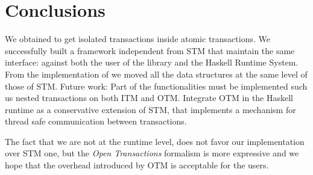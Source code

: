 
\chapter{Conclusions}

We obtained to get isolated transactions inside atomic transactions.
We successfully built a framework independent from STM that maintain the same interface: against both the user of the library and the Haskell Runtime System.
From the implementation of \citet{Toneguzzo} we moved all the data structures at the same level of those of STM.
Future work:
Part of the functionalities must be implemented such us nested transactions on both ITM and OTM.
Integrate OTM in the Haskell runtime as a conservative extension of STM, that implements a mechanism for thread safe communication between transactions.

The fact that we are not at the runtime level, does not favor our implementation over STM one, but the \emph{Open Transactions} formalism is more expressive and we hope that the overhead introduced by OTM is acceptable for the users.